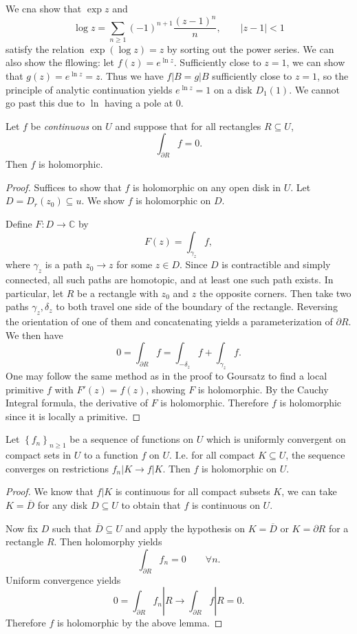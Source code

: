 
\begin{example}
	We cna show that $\exp z$ and
	\[
		\log z = \sum_{n\geq 1} (-1)^{n+1} \frac{(z-1)^n}{n} ,\qquad \left| z-1 \right| <1
	\]
	satisfy the relation $\exp (\log z)=z$ by sorting out the power series. We can also show the fllowing: let $f(z) = e^{\ln z} $. Sufficiently close to $z=1$, we can show that $g(z) = e^{\ln z} =z$. Thus we have $f|B = g|B$ sufficiently close to $z=1$, so the principle of analytic continuation yields $e^{\ln z} =1$ on a disk $D_1(1)$. We cannot go  past this due to $\ln $ having a pole at 0.
\end{example}

\begin{theorem}[Morena]\label{thm:?}
	Let $f$ be \emph{continuous} on $U$ and suppose that for all rectangles $R\subseteq U$,
	\[
		\int_{\partial R} f=0
	.\]
	Then $f$ is holomorphic.
\end{theorem}
\begin{proof}
	Suffices to show that $f$ is holomorphic on any open disk in $U$. Let $D = D_r(z_0)\subseteq u$. We show $f$ is holomorphic on $D$.

	Define $F : D \to \mathbb{C} $ by
	\[
		F(z) = \int_{\gamma _z} f,
	\]
	where $\gamma _z$ is a path $z_0 \to z$ for some $z\in D$. Since $D$ is contractible and simply connected, all such paths are homotopic, and at least one such path exists. In particular, let $R$ be a rectangle with $z_0$ and $z$ the opposite corners. Then take two paths $\gamma _z,\delta _z$ to both travel one side of the boundary of the rectangle. Reversing the orientation of one of them and concatenating yields a parameterization of $\partial R$. We then have
	\[
		0=\int_{\partial R} f = \int_{-\delta_z } f + \int_{\gamma_z } f
	.\]
	One may follow the same method as in the proof to Goursatz to find a local primitive $f$ with $F'(z)=f(z)$, showing $F$ is holomorphic. By the Cauchy Integral formula, the derivative of $F$ is holomorphic. Therefore $f$ is holomorphic since it is locally a primitive.
\end{proof}

\begin{theorem}\label{thm:?}
	Let $\left\{ f_n \right\} _{n\geq 1} $ be a sequence of functions on $U$ which is uniformly convergent on compact sets in $U$ to a function $f$ on $U$. I.e. for all compact $K\subseteq U$, the sequence converges on restrictions $f_n|K\to f|K$. Then $f$ is holomorphic on $U$.
\end{theorem}
\begin{proof}
	We know that $f|K$ is continuous for all compact subsets $K$, we can take $K = \overline{D} $ for any disk $D\subseteq U$ to obtain that $f$ is continuous on $U$.

	Now fix $D$ such that $\overline{D} \subseteq U$ and apply the hypothesis on $K=\overline{D} $ or $K=\partial R$ for a rectangle $R$. Then holomorphy yields
	\[
		\int_{\partial R} f_n=0\qquad \forall n
	.\]
	Uniform convergence yields
	\[
		0 = \int_{\partial R} f_n|R \to \int_{\partial R} f|R = 0
	.\]
	Therefore $f$ is holomorphic by the above lemma.
\end{proof}

